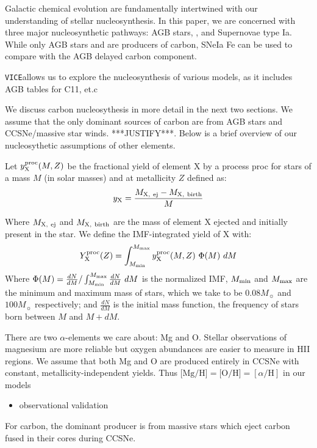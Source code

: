 \documentclass[fleqn,usenatbib]{mnras}
\newcommand{\VICE}{\texttt{VICE}}
\begin{document}
Galactic chemical evolution are fundamentally intertwined with our
understanding of stellar nucleosynthesis. In this paper, we are concerned with
three major nucleosynthetic pathways: AGB stars, \CC, and Supernovae type Ia.
While only AGB stars and \CC are producers of carbon, SNeIa Fe can be used to
compare with the AGB delayed carbon component. 

\VICE allows us to explore the nucleosynthesis of various models, as it
includes AGB tables for C11, et.c
    
We discuss carbon nucleosythesis in more detail in the next two sections. We
assume that the only dominant sources of carbon are from AGB stars and CCSNe/massive star winds. ***JUSTIFY***. Below  is a brief overview of our  nucleosythetic assumptions of other elements.

Let $y_{\rm X}^{\rm proc}(M, Z)$ be the fractional yield of element X by a process proc for stars of a mass $M$ (in solar masses) and at metallicity $Z$ defined as: 
\begin{equation}
    y_{\rm X} = \frac{M_{\rm X,\ ej} - M_{\rm X,\ birth}}{M}   
\end{equation}

Where $M_{\rm X,\ ej}$ and $M_{\rm X,\ birth}$ are the mass of element X ejected and initially present in the star. 
We define the IMF-integrated yield of X with: 
\begin{equation}
Y_{\rm X}^{\rm proc}(Z) = \int_{M_{\rm min}}^{M_{\rm max}} y_{\rm X}^{\rm proc}(M, Z)\ \Phi(M)  \ dM
\end{equation}
Where $\Phi(M) = \frac{dN}{dM}/ \int_{M_{\rm min}}^{M_{\rm max}} \frac{dN}{dM}\ dM$ is the normalized IMF, $M_{\rm min}$ and $M_{\rm max}$ are the minimum and maximum mass of stars, which we take to be $0.08 M_{\sun}$ and $100 M_{\sun}$ respectively; and $\frac{dN}{dM}$ is the initial mass function, the frequency of stars born between $M$ and $M+dM$.

There are two $\alpha$-elements we care about: Mg and O. Stellar observations of magnesium are more reliable but oxygen abundances are easier to measure in HII regions. We assume that both Mg and O are produced entirely in CCSNe with constant, metallicity-independent yields. Thus $\text{[Mg/H]} = \text{[O/H]} = [\alpha/\text{H}]$ in our models

\begin{itemize}
    \item observational validation
\end{itemize}
For carbon, the dominant producer is from massive stars which eject carbon fused in their cores during CCSNe. 
\end{document}
